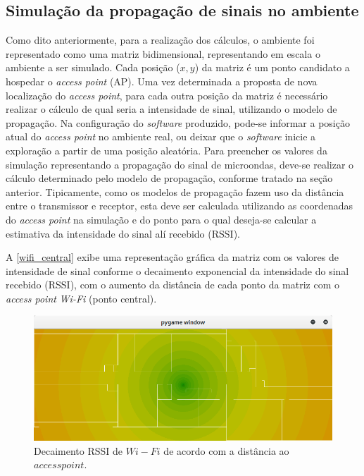 \documentclass[
	12pt,				%
	twoside,			%
	a4paper,			%
	english,			%
	french,				%
	spanish,			%
	brazil				%
	]{abntex2}
\begin{document}
\subsection{Simulação da propagação de sinais no
ambiente}\label{simulauxe7uxe3o-da-propagauxe7uxe3o-de-sinais-no-ambiente}

Como dito anteriormente, para a realização dos cálculos, o ambiente foi
representado como uma matriz bidimensional, representando em escala o
ambiente a ser simulado. Cada posição (\(x, y\)) da matriz é um ponto
candidato a hospedar o \emph{access point} (AP). Uma vez determinada a
proposta de nova localização do \emph{access point}, para cada outra
posição da matriz é necessário realizar o cálculo de qual seria a
intensidade de sinal, utilizando o modelo de propagação. Na configuração
do \emph{software} produzido, pode-se informar a posição atual do
\emph{access point} no ambiente real, ou deixar que o \emph{software}
inicie a exploração a partir de uma posição aleatória. Para preencher os
valores da simulação representando a propagação do sinal de microondas,
deve-se realizar o cálculo determinado pelo modelo de propagação,
conforme tratado na seção anterior. Tipicamente, como os modelos de
propagação fazem uso da distância entre o transmissor e receptor, esta
deve ser calculada utilizando as coordenadas do \emph{access point} na
simulação e do ponto para o qual deseja-se calcular a estimativa da
intensidade do sinal alí recebido (RSSI).

A \autoref{wifi_central} exibe uma representação gráfica da matriz com
os valores de intensidade de sinal conforme o decaimento exponencial da
intensidade do sinal recebido (RSSI), com o aumento da distância de cada
ponto da matriz com o \emph{access point} \emph{Wi-Fi} (ponto central).

\begin{figure}[!htb]
    \caption{\label{wifi_central} Decaimento RSSI de $Wi-Fi$ de acordo com a distância ao $access point$.}
    \begin{center}
        \includegraphics[scale=0.5]{imagens/wifi-central.jpg}
    \end{center}
\end{figure}
\end{document}
